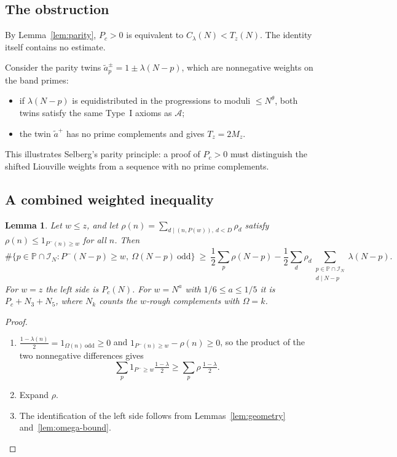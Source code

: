 \documentclass[final,11pt]{elsarticle}
\newtheorem{lemma}[theorem]{Lemma}
\theoremstyle{definition}
\theoremstyle{remark}
\newcommand{\PP}{\mathbb{P}}
\newcommand{\Pm}{P^{-}}
\newcommand{\band}{\mathcal{I}_N}
\numberwithin{equation}{section}
\begin{document}
\subsection{The obstruction}
By Lemma~\ref{lem:parity}, $P_c>0$ is equivalent to $C_\lambda(N)<T_z(N)$. The identity itself contains no estimate.

Consider the parity twins $\tilde a^{\pm}_p=1\pm\lambda(N-p)$, which are nonnegative weights on the band primes:
\begin{itemize}
\item if $\lambda(N-p)$ is equidistributed in the progressions to moduli $\le N^{\theta}$, both twins satisfy the same Type~I axioms as $\mathcal A$;
\item the twin $\tilde a^{+}$ has no prime complements and gives $T_z=2M_z$.
\end{itemize}
This illustrates Selberg's parity principle: a proof of $P_c>0$ must distinguish the shifted Liouville weights from a sequence with no prime complements.

\subsection{A combined weighted inequality}

\begin{lemma}\label{lem:combined}
Let $w\le z$, and let $\rho(n)=\sum_{d\mid(n,P(w)),\ d<D}\rho_d$ satisfy $\rho(n)\le1_{\Pm(n)\ge w}$ for all $n$. Then
\[
\#\{p\in\PP\cap\band:\Pm(N-p)\ge w,\ \Omega(N-p)\ \text{odd}\}\ \ge\ \frac12\sum_{p}\rho(N-p)-\frac12\sum_{d}\rho_d\sum_{\substack{p\in\PP\cap\band\\ d\mid N-p}}\lambda(N-p).
\]
For $w=z$ the left side is $P_c(N)$. For $w=N^{a}$ with $1/6\le a\le 1/5$ it is $P_c+N_3+N_5$, where $N_k$ counts the $w$-rough complements with $\Omega=k$.
\end{lemma}

\begin{proof}
\begin{enumerate}
\item $\frac{1-\lambda(n)}2=1_{\Omega(n)\ \text{odd}}\ge0$ and $1_{\Pm(n)\ge w}-\rho(n)\ge0$, so the product of the two nonnegative differences gives
\[
\sum_p1_{\Pm\ge w}\tfrac{1-\lambda}{2}\ge\sum_p\rho\,\tfrac{1-\lambda}{2}.
\]
\item Expand $\rho$.
\item The identification of the left side follows from Lemmas~\ref{lem:geometry} and~\ref{lem:omega-bound}. \qedhere
\end{enumerate}
\end{proof}
\end{document}
